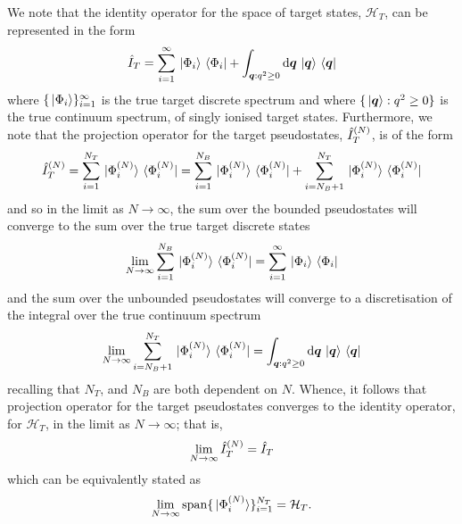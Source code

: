 \documentclass[draft]{article}
\begin{document}
We note that the identity operator for the space of target states,
$\mathcal{H}_{T}$, can be represented in the form
\begin{equation}
  \label{eq:target-identity}
  \hat{I}_{T}
  =
  \sum_{i = 1}^{\infty}
  \ket*{\Phi_{i}}
  \bra*{\Phi_{i}}
  +
  \int_{\boldsymbol{q} : q^{2} \geq 0}
  \dd{\boldsymbol{q}}
  \ket*{\boldsymbol{q}}
  \bra*{\boldsymbol{q}}
\end{equation}
where $\lbrace\ket*{\Phi_{i}}\rbrace_{i = 1}^{\infty}$ is the true target discrete
spectrum and where $\lbrace\ket*{\boldsymbol{q}} : q^{2} \geq 0\rbrace$ is the true
continuum spectrum, of singly ionised target states.
Furthermore, we note that the projection operator for the target pseudostates,
$\hat{I}_{T}^{(N)}$, is of the form
\begin{equation}
  \label{eq:target-projection}
  \hat{I}_{T}^{(N)}
  =
  \sum_{i = 1}^{N_{T}}
  \ket*{\Phi_{i}^{(N)}}
  \bra*{\Phi_{i}^{(N)}}
  =
  \sum_{i = 1}^{N_{B}}
  \ket*{\Phi_{i}^{(N)}}
  \bra*{\Phi_{i}^{(N)}}
  +
  \sum_{i = N_{B} + 1}^{N_{T}}
  \ket*{\Phi_{i}^{(N)}}
  \bra*{\Phi_{i}^{(N)}}
\end{equation}
and so in the limit as $N \to \infty$, the sum over the bounded pseudostates
will converge to the sum over the true target discrete states
\begin{equation}
  \label{eq:target-projection-discrete}
  \lim_{N \to \infty}
  \sum_{i = 1}^{N_{B}}
  \ket*{\Phi_{i}^{(N)}}
  \bra*{\Phi_{i}^{(N)}}
  =
  \sum_{i = 1}^{\infty}
  \ket*{\Phi_{i}}
  \bra*{\Phi_{i}}
\end{equation}
and the sum over the unbounded pseudostates will converge to a discretisation of
the integral over the true continuum spectrum
\begin{equation}
  \label{eq:target-projection-continuum}
  \lim_{N \to \infty}
  \sum_{i = N_{B} + 1}^{N_{T}}
  \ket*{\Phi_{i}^{(N)}}
  \bra*{\Phi_{i}^{(N)}}
  =
  \int_{\boldsymbol{q} : q^{2} \geq 0}
  \dd{\boldsymbol{q}}
  \ket*{\boldsymbol{q}}
  \bra*{\boldsymbol{q}}
\end{equation}
recalling that $N_{T}$, and $N_{B}$ are both dependent on $N$.
Whence, it follows that projection operator for the target pseudostates
converges to the identity operator, for $\mathcal{H}_{T}$,
in the limit as $N \to \infty$; that is,
\begin{equation}
  \label{eq:target-projection-convergence}
  \lim_{N \to \infty}
  \hat{I}_{T}^{(N)}
  =
  \hat{I}_{T}
\end{equation}
which can be equivalently stated as
\begin{equation}
  \label{eq:target-state-completeness}
  \lim_{N \to \infty}
  \mathrm{span}\lbrace
    \ket*{\Phi_{i}^{(N)}}
  \rbrace_{i = 1}^{N_{T}}
  =
  \mathcal{H}_{T}
  .
\end{equation}
\end{document}
